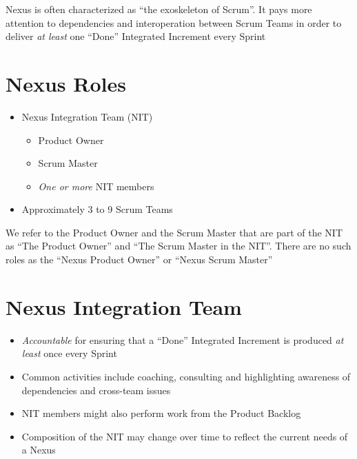 \documentclass[a4paper,11pt,twocolumn]{article}
\begin{document}
\begin{tcolorbox}[colback=black!8!white,colframe=gray!50!black,title=Note,sharp corners,fonttitle=\normalsize\bfseries,fontupper=\normalsize]
    Nexus is often characterized as ``the exoskeleton of Scrum''. It pays more attention to dependencies and interoperation between Scrum Teams in order to deliver \textit{at least} one ``Done'' Integrated Increment every Sprint
\end{tcolorbox}

\section*{Nexus Roles}
\begin{itemize}
	\item Nexus Integration Team (NIT)
	\vspace{-0.5em}
	\begin{itemize}
	    \item Product Owner
	    \item Scrum Master
	    \item \textit{One or more} NIT members
    \end{itemize}
	\item Approximately 3 to 9 Scrum Teams
\end{itemize}

\begin{tcolorbox}[colback=black!8!white,colframe=gray!50!black,title=Note,sharp corners,fonttitle=\normalsize\bfseries,fontupper=\normalsize]
    We refer to the Product Owner and the Scrum Master that are part of the NIT as ``The Product Owner'' and ``The Scrum Master in the NIT''. There are no such roles as the ``Nexus Product Owner'' or ``Nexus Scrum Master''
\end{tcolorbox}

\section*{Nexus Integration Team}
\begin{itemize}
	\item \textit{Accountable} for ensuring that a ``Done'' Integrated Increment is produced \textit{at least} once every Sprint
	\item Common activities include coaching, consulting and highlighting awareness of dependencies and cross-team issues
	\item NIT members might also perform work from the Product Backlog
	\item Composition of the NIT may change over time to reflect the current needs of a Nexus
\end{itemize}
\end{document}
